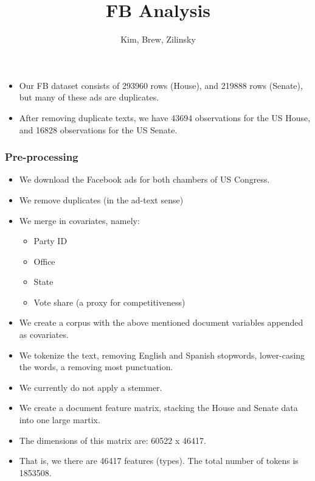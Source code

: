\documentclass[
  12pt,
]{article}
\title{FB Analysis}
\author{Kim, Brew, Zilinsky}
\date{}
\providecommand{\tightlist}{%
  \setlength{\itemsep}{0pt}\setlength{\parskip}{0pt}}
\begin{document}
\maketitle

\begin{itemize}
\tightlist
\item
  Our FB dataset consists of 293960 rows (House), and 219888 rows (Senate), but many of these ads are duplicates.
\item
  After removing duplicate texts, we have 43694 observations for the US House, and 16828 observations for the US Senate.
\end{itemize}

\hypertarget{pre-processing}{%
\subsubsection{Pre-processing}\label{pre-processing}}

\begin{itemize}
\tightlist
\item
  We download the Facebook ads for both chambers of US Congress.
\item
  We remove duplicates (in the ad-text sense)
\item
  We merge in covariates, namely:

  \begin{itemize}
  \tightlist
  \item
    Party ID
  \item
    Office
  \item
    State
  \item
    Vote share (a proxy for competitiveness)
  \end{itemize}
\item
  We create a corpus with the above mentioned document variables appended as covariates.
\item
  We tokenize the text, removing English and Spanish stopwords, lower-casing the words, a removing most punctuation.
\item
  We currently do not apply a stemmer.
\item
  We create a document feature matrix, stacking the House and Senate data into one large martix.
\item
  The dimensions of this matrix are: 60522 x 46417.
\item
  That is, we there are 46417 features (types). The total number of tokens is 1853508.
\end{itemize}
\end{document}
